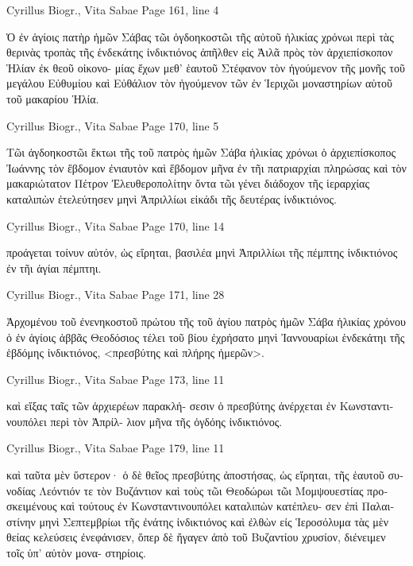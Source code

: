 \documentclass[12pt,letterpaper,twoside,final]{memoir}
\begin{document}
\begin{greek}
Cyrillus Biogr., Vita Sabae 
Page 161, line 4

Ὁ ἐν ἁγίοις πατὴρ ἡμῶν Σάβας τῶι ὀγδοηκοστῶι τῆς αὐτοῦ 
ἡλικίας χρόνωι περὶ τὰς θερινὰς τροπὰς τῆς ἑνδεκάτης ἰνδικτιόνος 
ἀπῆλθεν εἰς Ἀιλᾶ πρὸς τὸν ἀρχιεπίσκοπον Ἡλίαν ἐκ θεοῦ οἰκονο-
μίας ἔχων μεθ' ἑαυτοῦ Στέφανον τὸν ἡγούμενον τῆς μονῆς τοῦ μεγάλου 
Εὐθυμίου καὶ Εὐθάλιον τὸν ἡγούμενον τῶν ἐν Ἱεριχῶι μοναστηρίων 
αὐτοῦ τοῦ μακαρίου Ἡλία. 



Cyrillus Biogr., Vita Sabae 
Page 170, line 5

Τῶι ἀγδοηκοστῶι ἕκτωι τῆς τοῦ πατρὸς ἡμῶν Σάβα ἡλικίας 
χρόνωι ὁ ἀρχιεπίσκοπος Ἰωάννης τὸν ἕβδομον ἐνιαυτὸν καὶ ἕβδομον 
μῆνα ἐν τῆι πατριαρχίαι πληρώσας καὶ τὸν μακαριώτατον Πέτρον 
Ἐλευθεροπολίτην ὄντα τῶι γένει διάδοχον τῆς ἱεραρχίας καταλιπὼν 
ἐτελεύτησεν μηνὶ Ἀπριλλίωι εἰκάδι τῆς δευτέρας ἰνδικτιόνος. 



Cyrillus Biogr., Vita Sabae 
Page 170, line 14

                                                         προάγεται 
τοίνυν αὐτόν, ὡς εἴρηται, βασιλέα μηνὶ Ἀπριλλίωι τῆς πέμπτης 
ἰνδικτιόνος ἐν τῆι ἁγίαι πέμπτηι. 



Cyrillus Biogr., Vita Sabae 
Page 171, line 28

Ἀρχομένου τοῦ ἐνενηκοστοῦ πρώτου τῆς τοῦ ἁγίου πατρὸς ἡμῶν 
Σάβα ἡλικίας χρόνου ὁ ἐν ἁγίοις ἀββᾶς Θεοδόσιος τέλει τοῦ βίου 
ἐχρήσατο μηνὶ Ἰαννουαρίωι ἑνδεκάτηι τῆς ἑβδόμης ἰνδικτιόνος, 
<πρεσβύτης καὶ πλήρης ἡμερῶν>. 



Cyrillus Biogr., Vita Sabae 
Page 173, line 11

                              καὶ εἴξας ταῖς τῶν ἀρχιερέων παρακλή-
σεσιν ὁ πρεσβύτης ἀνέρχεται ἐν Κωνσταντινουπόλει περὶ τὸν Ἀπρίλ-
λιον μῆνα τῆς ὀγδόης ἰνδικτιόνος. 



Cyrillus Biogr., Vita Sabae 
Page 179, line 11

                                               καὶ ταῦτα μὲν ὕστερον· 
ὁ δὲ θεῖος πρεσβύτης ἀποστήσας, ὡς εἴρηται, τῆς ἑαυτοῦ συνοδίας 
Λεόντιόν τε τὸν Βυζάντιον καὶ τοὺς τῶι Θεοδώρωι τῶι Μομψουεστίας 
προσκειμένους καὶ τούτους ἐν Κωνσταντινουπόλει καταλιπὼν κατέπλευ-
σεν ἐπὶ Παλαιστίνην μηνὶ Σεπτεμβρίωι τῆς ἐνάτης ἰνδικτιόνος καὶ 
ἐλθὼν εἰς Ἱεροσόλυμα τὰς μὲν θείας κελεύσεις ἐνεφάνισεν, ὅπερ δὲ 
ἤγαγεν ἀπὸ τοῦ Βυζαντίου χρυσίον, διένειμεν τοῖς ὑπ' αὐτὸν μονα-
στηρίοις. 




\end{greek}
\end{document}
